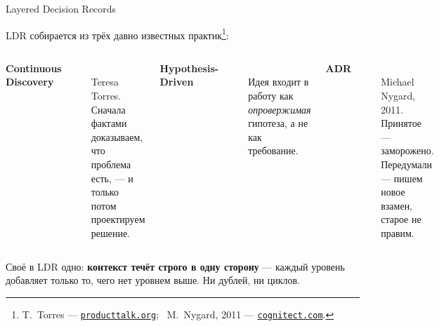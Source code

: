 \documentclass[11pt, aspectratio=169]{beamer}
\begin{document}
\begin{frame}{Layered Decision Records}
  \vspace{0.1cm}

  LDR собирается из трёх давно известных практик\footnote{T.\ Torres ---
  \href{https://www.producttalk.org/}{\texttt{producttalk.org}}; \ M.\ Nygard, 2011 ---
  \href{https://cognitect.com/blog/2011/11/15/documenting-architecture-decisions}{\texttt{cognitect.com}}.}:

  \vspace{0.1cm}

  \begin{columns}[t, onlytextwidth]
      \textbf{\small Continuous Discovery}\\
      \textcolor{mutedText}{\rule{\linewidth}{0.4pt}}\\[4pt]
      \footnotesize Teresa Torres.\\[4pt]
      Сначала фактами доказываем, что проблема есть, ---
      и только потом проектируем решение.

      \textbf{\small Hypothesis-Driven}\\
      \textcolor{mutedText}{\rule{\linewidth}{0.4pt}}\\[4pt]
      \footnotesize Идея входит в работу как \emph{опровержимая} гипотеза,
      а не как требование.

      \textbf{\small ADR}\\
      \textcolor{mutedText}{\rule{\linewidth}{0.4pt}}\\[4pt]
      \footnotesize Michael Nygard, 2011.\\[4pt]
      Принятое --- заморожено. Передумали --- пишем новое взамен,
      старое не правим.
  \end{columns}

  \vspace{0.25cm}
  \begin{center}
  \begin{minipage}{0.9\textwidth}
  \small
  Своё в LDR одно: \textbf{контекст течёт строго в одну сторону} ---
  каждый уровень добавляет только то, чего нет уровнем выше.
  Ни дублей, ни циклов.
  \end{minipage}
  \end{center}
\end{frame}
\end{document}
